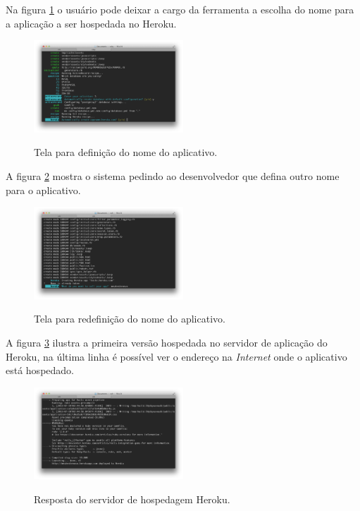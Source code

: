 Na figura \ref{fig:fig8} o usu\'ario pode deixar a cargo da ferramenta a escolha do nome para a aplica\c{c}\~ao a ser hospedada no Heroku.

\begin{figure}[h]
  \centering
  \caption{Tela para defini\c{c}\~ao do nome do aplicativo.}
  \includegraphics[width=0.5\textwidth]{./fig/setup3}
  \label{fig:fig8}
\end{figure}

\pagebreak

A figura \ref{fig:fig9} mostra o sistema pedindo ao desenvolvedor que defina outro nome para o aplicativo.

\begin{figure}[h]
  \centering
  \caption{Tela para redefini\c{c}\~ao do nome do aplicativo.}
  \includegraphics[width=0.5\textwidth]{./fig/setup4}
  \label{fig:fig9}
\end{figure}

A figura \ref{fig:fig10} ilustra a primeira vers\~ao hospedada no servidor de aplica\c{c}\~ao do Heroku, na \'ultima linha \'e poss\'ivel ver o endere\c{c}o na \emph{Internet} onde o aplicativo est\'a hospedado.

\begin{figure}[h]
  \centering
  \caption{Resposta do servidor de hospedagem Heroku.}
  \includegraphics[width=0.5\textwidth]{./fig/setup5}
  \label{fig:fig10}
\end{figure}

